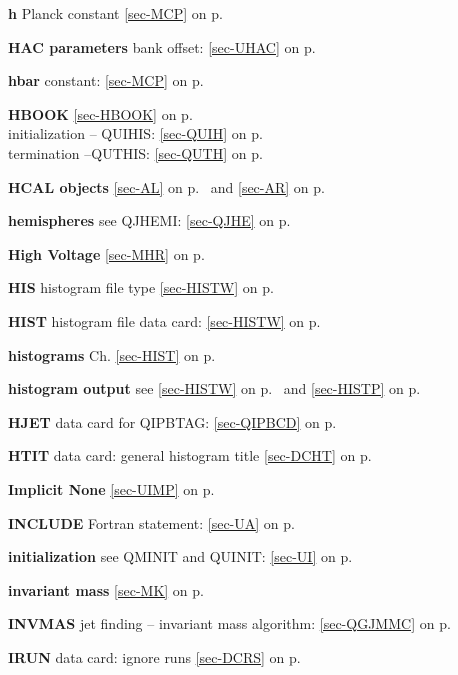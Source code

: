  
 \item{\bf h   }Planck constant \ref{sec-MCP} on p.~\pageref{sec-MCP}\\
 \item{\bf HAC parameters  }bank offset: \ref{sec-UHAC} on p.~\pageref{sec-UHAC}\\
 \item{\bf hbar    }constant: \ref{sec-MCP} on p.~\pageref{sec-MCP}\\
 \item{\bf HBOOK   }\ref{sec-HBOOK} on p.~\pageref{sec-HBOOK}\\
 \subitem initialization -- QUIHIS: \ref{sec-QUIH} on p.~\pageref{sec-QUIH}\\
 \subitem termination --QUTHIS: \ref{sec-QUTH} on p.~\pageref{sec-QUTH}\\
 \item{\bf HCAL objects    }\ref{sec-AL} on p.~\pageref{sec-AL} and
 \ref{sec-AR} on p.~\pageref{sec-AR}\\
 \item{\bf hemispheres }see QJHEMI: \ref{sec-QJHE} on p.~\pageref{sec-QJHE}\\
 \item{\bf High Voltage } \ref{sec-MHR} on p.~\pageref{sec-MHR}\\
 \item{\bf HIS     }histogram file type \ref{sec-HISTW} on p.~\pageref{sec-HISTW}\\
 \item{\bf HIST    }histogram file data card: \ref{sec-HISTW} on p.~\pageref{sec-HISTW}\\
 \item{\bf histograms }Ch. \ref{sec-HIST} on p.~\pageref{sec-HIST}\\
 \item{\bf histogram output  }see \ref{sec-HISTW} on p.~\pageref{sec-HISTW} and
 \ref{sec-HISTP} on p.~\pageref{sec-HISTP}\\
 \item{\bf HJET    }data card for QIPBTAG:  \ref{sec-QIPBCD} on p.~\pageref{sec-QIPBCD}\\
 \item{\bf HTIT    }data card: general histogram title \ref{sec-DCHT} on p.~\pageref{sec-DCHT}
 
 \item{\bf Implicit None }\ref{sec-UIMP} on p.~\pageref{sec-UIMP}\\
 \item{\bf INCLUDE     }Fortran statement: \ref{sec-UA} on p.~\pageref{sec-UA}\\
 \item{\bf initialization  }see QMINIT and QUINIT: \ref{sec-UI} on p.~\pageref{sec-UI}\\
 \item{\bf invariant mass  }\ref{sec-MK} on p.~\pageref{sec-MK}\\
 \item{\bf INVMAS  }jet finding -- invariant mass  algorithm:
 \ref{sec-QGJMMC} on p.~\pageref{sec-QGJMMC}\\
 \item{\bf IRUN    }data card: ignore runs \ref{sec-DCRS} on p.~\pageref{sec-DCRS}
 
